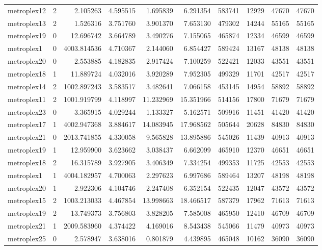\begin{longtable}{|l|r|r|r|r|r|r|r|r|r|}
metroplex12 & 2 & 2.105263 & 4.595515 & 1.695839 & 6.291354 & 583741 & 12929 & 47670 & 47670 \\
metroplex13 & 2 & 1.526316 & 3.751760 & 3.901370 & 7.653130 & 479302 & 14244 & 55165 & 55165 \\
metroplex19 & 0 & 12.696742 & 3.664789 & 3.490276 & 7.155065 & 465874 & 12334 & 46599 & 46599 \\
metroplex1 & 0 & 4003.814536 & 4.710367 & 2.144060 & 6.854427 & 589424 & 13167 & 48138 & 48138 \\
metroplex20 & 0 & 2.553885 & 4.182835 & 2.917424 & 7.100259 & 522421 & 12033 & 43551 & 43551 \\
metroplex18 & 1 & 11.889724 & 4.032016 & 3.920289 & 7.952305 & 499329 & 11701 & 42517 & 42517 \\
metroplex14 & 2 & 1002.897243 & 3.583517 & 3.482641 & 7.066158 & 453145 & 14954 & 58892 & 58892 \\
metroplex11 & 2 & 1001.919799 & 4.118997 & 11.232969 & 15.351966 & 514156 & 17800 & 71679 & 71679 \\
metroplex23 & 0 & 3.365915 & 4.029244 & 1.133327 & 5.162571 & 509916 & 11451 & 41420 & 41420 \\
metroplex17 & 1 & 4002.947368 & 3.884617 & 14.083945 & 17.968562 & 505644 & 20628 & 84830 & 84830 \\
metroplex21 & 0 & 2013.741855 & 4.330058 & 9.565828 & 13.895886 & 545026 & 11439 & 40913 & 40913 \\
metroplex19 & 1 & 12.959900 & 3.623662 & 3.038437 & 6.662099 & 465910 & 12370 & 46651 & 46651 \\
metroplex18 & 2 & 16.315789 & 3.927905 & 3.406349 & 7.334254 & 499353 & 11725 & 42553 & 42553 \\
metroplex1 & 1 & 4004.182957 & 4.700063 & 2.297623 & 6.997686 & 589464 & 13207 & 48198 & 48198 \\
metroplex20 & 1 & 2.922306 & 4.104746 & 2.247408 & 6.352154 & 522435 & 12047 & 43572 & 43572 \\
metroplex15 & 2 & 1003.213033 & 4.467854 & 13.998663 & 18.466517 & 587379 & 17962 & 71613 & 71613 \\
metroplex19 & 2 & 13.749373 & 3.756803 & 3.828205 & 7.585008 & 465950 & 12410 & 46709 & 46709 \\
metroplex21 & 1 & 2009.583960 & 4.374422 & 4.169016 & 8.543438 & 545066 & 11479 & 40973 & 40973 \\
metroplex25 & 0 & 2.578947 & 3.638016 & 0.801879 & 4.439895 & 465048 & 10162 & 36090 & 36090 \\

\end{longtable}
